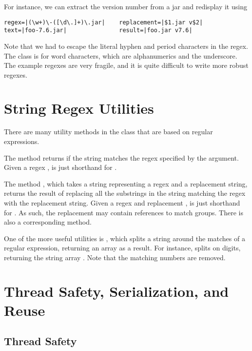 For instance, we can extract the version number from a jar and
redisplay it using
%
\begin{verbatim}
regex=|(\w+)\-([\d\.]+)\.jar|    replacement=|$1.jar v$2|
text=|foo-7.6.jar|               result=|foo.jar v7.6|
\end{verbatim}
%
Note that we had to escape the literal hyphen and period characters in
the regex.  The class  is for word characters, which are
alphanumerics and the underscore.  The example regexes are very
fragile, and it is quite difficult to write more robust regexes.

\section{String Regex Utilities}

There are many utility methods in the  class that
are based on regular expressions.  

The method  returns  if the string
matches the regex specified by the argument.  Given a regex ,
 is just shorthand for
.

The method , which takes a string
representing a regex and a replacement string, returns the result
of replacing all the substrings in the string matching the regex
with the replacement string.  Given a regex  and replacement
,  is just shorthand for
.  As such,
the replacement may contain references to match groups.  There is also
a corresponding  method.

One of the more useful utilities is
, which splits a string around the matches of
a regular expression, returning an array as a result.  For instance,
 splits on digits, returning
the string array .  Note that the
matching numbers are removed.

\section{Thread Safety, Serialization, and Reuse}

\subsection{Thread Safety}

